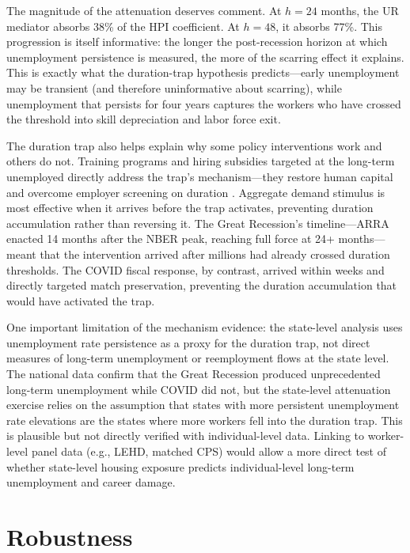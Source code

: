 \documentclass[12pt]{article}
\begin{document}
The magnitude of the attenuation deserves comment. At $h = 24$ months, the UR mediator absorbs 38\% of the HPI coefficient. At $h = 48$, it absorbs 77\%. This progression is itself informative: the longer the post-recession horizon at which unemployment persistence is measured, the more of the scarring effect it explains. This is exactly what the duration-trap hypothesis predicts---early unemployment may be transient (and therefore uninformative about scarring), while unemployment that persists for four years captures the workers who have crossed the threshold into skill depreciation and labor force exit.

The duration trap also helps explain why some policy interventions work and others do not. Training programs and hiring subsidies targeted at the long-term unemployed directly address the trap's mechanism---they restore human capital and overcome employer screening on duration \citep{card2018works}. Aggregate demand stimulus is most effective when it arrives before the trap activates, preventing duration accumulation rather than reversing it. The Great Recession's timeline---ARRA enacted 14 months after the NBER peak, reaching full force at 24+ months---meant that the intervention arrived after millions had already crossed duration thresholds. The COVID fiscal response, by contrast, arrived within weeks and directly targeted match preservation, preventing the duration accumulation that would have activated the trap.

One important limitation of the mechanism evidence: the state-level analysis uses unemployment rate persistence as a proxy for the duration trap, not direct measures of long-term unemployment or reemployment flows at the state level. The national data confirm that the Great Recession produced unprecedented long-term unemployment while COVID did not, but the state-level attenuation exercise relies on the assumption that states with more persistent unemployment rate elevations are the states where more workers fell into the duration trap. This is plausible but not directly verified with individual-level data. Linking to worker-level panel data (e.g., LEHD, matched CPS) would allow a more direct test of whether state-level housing exposure predicts individual-level long-term unemployment and career damage.


\section{Robustness}
\label{sec:robustness}
\end{document}
